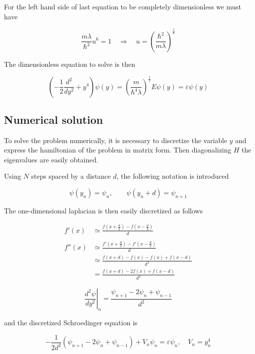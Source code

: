 \documentclass{article}
\begin{document}
For the left hand side of last equation to be completely dimensionless we must have

\begin{equation}
\frac{m\lambda}{\hbar^2} u^6 = 1 \quad \Rightarrow \quad u = \left( \frac{\hbar^2}{m\lambda} \right)^{\frac{1}{6}}
\end{equation}

The dimensionless equation to solve is then

\begin{equation}
\left( -\frac{1}{2}\frac{d^2}{dy^2} + y^4 \right) \psi(y) = \left(\frac{m}{\hbar^4 \lambda} \right)^{\frac{1}{3}} E \psi(y) = \varepsilon \psi(y)
\end{equation}

\subsection{Numerical solution}

To solve the problem numerically, it is necessary to discretize the variable \( y \) and express the hamiltonian of the problem in matrix form. Then diagonalizing \( H \) the eigenvalues are easily obtained.

Using \( N \) steps spaced by a distance \( d \), the following notation is introduced

\[ \psi(y_n) = \psi_n, \qquad \psi(y_n + d) = \psi_{n+1} \]

The one-dimensional laplacian is then easily discretized as follows

\begin{align*}
f'(x) & \simeq \frac{f\left(x+\frac{d}{2}\right) - f\left(x-\frac{d}{2}\right)}{d} \\ \\
f''(x) & \simeq \frac{f'\left(x+\frac{d}{2}\right) - f'\left(x-\frac{d}{2}\right)}{d} \\
& \simeq \frac{f\left(x+d\right) - f(x) - f(x) + f\left(x-d\right)}{d^2} \\
& = \frac{f(x+d) - 2f(x) + f(x-d)}{d^2}
\end{align*}

\begin{equation}
\left. \frac{d^2\psi}{dy^2} \right\vert_n = \frac{\psi_{n+1} - 2\psi_n + \psi_{n-1}}{d^2}
\end{equation}

and the discretized Schroedinger equation is

\begin{equation}
\label{eq:discrete_se}
-\frac{1}{2d^2} \left( \psi_{n+1} - 2\psi_n + \psi_{n-1} \right) + V_n \psi_n = \varepsilon \psi_n, \quad V_n = y_n^4
\end{equation}
\end{document}
